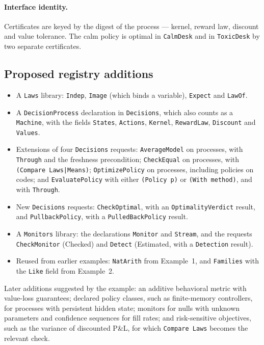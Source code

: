 \documentclass[11pt]{article}
\newcommand{\code}[1]{\texttt{#1}}
\theoremstyle{definition}
\theoremstyle{plain}
\begin{document}
\paragraph{Interface identity.} Certificates are keyed by the digest of the process --- kernel, reward
law, discount and value tolerance. The calm policy is optimal in \code{CalmDesk} and in \code{ToxicDesk} by
two separate certificates.

\subsection{Proposed registry additions}

\begin{itemize}
\item A \code{Laws} library: \code{Indep}, \code{Image} (which binds a variable), \code{Expect} and
\code{LawOf}.
\item A \code{DecisionProcess} declaration in \code{Decisions}, which also counts as a \code{Machine}, with
the fields \code{States}, \code{Actions}, \code{Kernel}, \code{RewardLaw}, \code{Discount} and \code{Values}.
\item Extensions of four \code{Decisions} requests: \code{AverageModel} on processes, with \code{Through}
and the freshness precondition; \code{CheckEqual} on processes, with \code{(Compare Laws|Means)};
\code{OptimizePolicy} on processes, including policies on codes; and \code{EvaluatePolicy} with either
\code{(Policy p)} or \code{(With method)}, and with \code{Through}.
\item New \code{Decisions} requests: \code{CheckOptimal}, with an \code{OptimalityVerdict} result, and
\code{PullbackPolicy}, with a \code{PulledBackPolicy} result.
\item A \code{Monitors} library: the declarations \code{Monitor} and \code{Stream}, and the requests
\code{CheckMonitor} (Checked) and \code{Detect} (Estimated, with a \code{Detection} result).
\item Reused from earlier examples: \code{NatArith} from Example~1, and \code{Families} with the
\code{Like} field from Example~2.
\end{itemize}
Later additions suggested by the example: an additive behavioral metric with value-loss guarantees;
declared policy classes, such as finite-memory controllers, for processes with persistent hidden state;
monitors for nulls with unknown parameters and confidence sequences for fill rates; and risk-sensitive
objectives, such as the variance of discounted P\&L, for which \code{Compare Laws} becomes the relevant
check.
\end{document}

